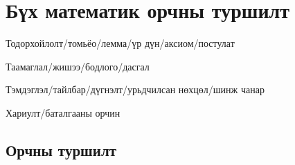 \documentclass[nm]{../../elegantbook}
\begin{document}
\chapter{Бүх математик орчны туршилт}
\begin{introduction}
\item Тодорхойлолт/томьёо/лемма/үр дүн/аксиом/постулат
\item Таамаглал/жишээ/бодлого/дасгал
\item Тэмдэглэл/тайлбар/дүгнэлт/урьдчилсан нөхцөл/шинж чанар
\item Хариулт/баталгааны орчин
\end{introduction}

\section{Орчны туршилт}
\end{document}
